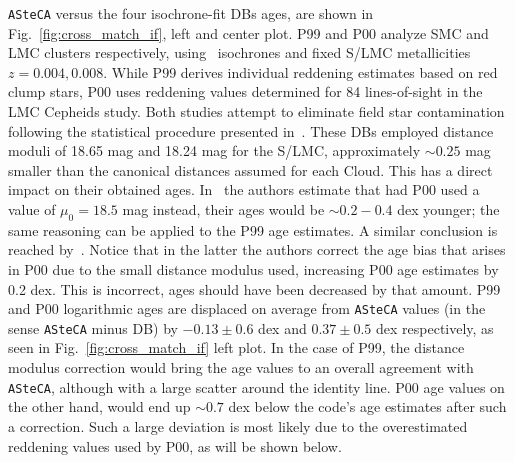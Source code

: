 \documentclass{aa}
\begin{document}
%
%
\texttt{ASteCA} versus the four isochrone-fit DBs ages, are shown in
Fig.~\ref{fig:cross_match_if}, left and center plot.
%
P99 and P00 analyze SMC and LMC clusters respectively,
using~\cite{Bertelli_1994} isochrones and fixed S/LMC metallicities
$z{=}0.004, 0.008$. While P99 derives individual reddening estimates based on
red clump stars, P00 uses reddening values determined for 84 lines-of-sight
in the~\cite{Udalski_1999} LMC Cepheids study.
%
Both studies attempt to eliminate field star contamination following the
statistical procedure presented in~\cite{Mateo_1986}.
These DBs employed distance moduli of 18.65 mag and 18.24 mag for the S/LMC,
approximately ${\sim}0.25$ mag smaller than the canonical distances assumed for
each Cloud. This has a direct impact on their obtained ages.
%
In~\cite{de_Grijs_2006} the authors estimate that had P00 used a value
of $\mu_0{=}18.5$ mag instead, their ages would be ${\sim}0.2{-}0.4$
dex younger; the same reasoning can be applied to the P99 age estimates.
A similar conclusion is reached by~\cite{Baumgardt_2013}.
Notice that in the latter the authors correct the age bias that
arises in P00 due to the small distance modulus used, increasing P00 age
estimates by 0.2 dex. This is incorrect, ages should have been decreased by that
amount. 
%
P99 and P00 logarithmic ages are displaced on average from \texttt{ASteCA}
values (in the sense \texttt{ASteCA} minus DB) by $-0.13{\pm}0.6$ dex and $0.37
{\pm}0.5$ dex respectively, as seen in Fig.~\ref{fig:cross_match_if} left plot.
In the case of P99, the distance modulus correction would bring the age values
to an overall agreement with \texttt{ASteCA}, although with a large scatter
around the identity line.
%
P00 age values on the other hand, would end up ${\sim}0.7$ dex below the code's
age estimates after such a correction. Such a large deviation is most likely due
to the overestimated reddening values used by P00, as will be shown below.
\end{document}
